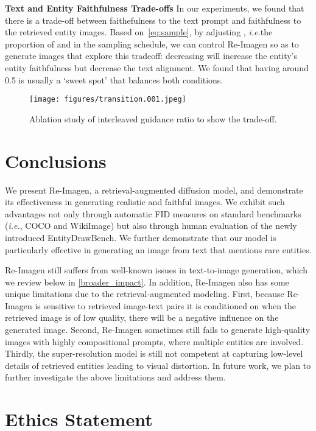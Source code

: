 \documentclass{article} \usepackage{iclr2023_conference,times}
\newcommand{\ie}{\textit{i.e.}}
\newcommand{\modelname}{{Re-Imagen}\xspace}
\begin{document}
\noindent \textbf{Text and Entity Faithfulness Trade-offs}
In our experiments, we found that there is a trade-off between faithefulness to the text prompt and faithfulness to the retrieved entity images. Based on~\autoref{eq:sample}, by adjusting , \ie the proportion of  and  in the sampling schedule, we can control \modelname so as to generate images that explore this tradeoff: decreasing  will increase the entity's entity faithfulness but decrease the text alignment. We found that having  around 0.5 is usually a `sweet spot' that balances both conditions.
\begin{figure}[!t]
    \centering
    \texttt{[image: figures/transition.001.jpeg]}
    \vspace{-2ex}
    \caption{Ablation study of interleaved guidance ratio  to show the trade-off. }
    \vspace{-1ex}
    \label{fig:transition}
\end{figure}


\section{Conclusions}
We present \modelname, a retrieval-augmented diffusion model, and demonstrate its effectiveness in generating realistic and faithful images. We exhibit such advantages not only through automatic FID measures on standard benchmarks (\ie, COCO and WikiImage) but also through human evaluation of the newly introduced EntityDrawBench. We further demonstrate that our model is particularly effective in generating an image from text that mentions rare entities. 

\modelname still suffers from well-known issues in text-to-image generation, which we review below in \autoref{broader_impact}. In addition, \modelname also has some unique limitations due to the retrieval-augmented modeling. First, because \modelname is sensitive to retrieved image-text pairs it is conditioned on when the retrieved image is of low quality, there will be a negative influence on the generated image. Second, \modelname sometimes still fails to generate high-quality images with highly compositional prompts, where multiple entities are involved. Thirdly, the super-resolution model is still not competent at capturing low-level details of retrieved entities leading to visual distortion. In future work, we plan to further investigate the above limitations and address them.

\section*{Ethics Statement}
\label{broader_impact}
\end{document}
